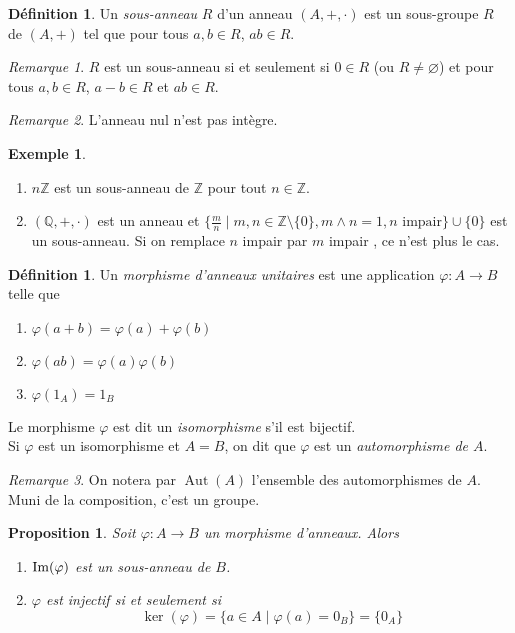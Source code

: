 \documentclass{article}
\newcommand{\Z}{\mathbb{Z}}
\newcommand{\Q}{\mathbb{Q}}
\DeclareMathOperator{\Aut}{Aut}
\renewcommand{\Im}{\mathop{\rm Im}}
\theoremstyle{plain}
\newtheorem{proposition}[theorem]{Proposition}
\theoremstyle{definition}
\newtheorem{definition}[theorem]{Définition}
\newtheorem{example}[theorem]{Exemple}
\theoremstyle{remark}
\newtheorem*{remark}{Remarque}
\begin{document}
\begin{definition}
    Un \emph{sous-anneau} $R$ d'un anneau $(A,+,\cdot)$ est un sous-groupe $R$ de $(A,+)$ tel que pour tous $a,b \in R$, $ab \in R$.
\end{definition}

\begin{remark}
    $R$ est un sous-anneau si et seulement si $0 \in R$ (ou $R \ne \varnothing$) et pour tous $a,b \in R$, $a-b \in R$ et $ab \in R$.
\end{remark}

\begin{remark}
    L'anneau nul n'est pas intègre.
\end{remark}

\begin{example} \leavevmode
    \begin{enumerate}
        \item $n\Z$ est un sous-anneau de $\Z$ pour tout $n \in \Z$.
        \item $(\Q,+,\cdot)$ est un anneau et $\{\frac{m}{n} \mid m,n \in \Z \setminus\{0\}, m \wedge n = 1, n\text{ impair}\} \cup \{0\}$ est un sous-anneau. Si on remplace \og $n$ impair \fg par \og $m$ impair \fg, ce n'est plus le cas.
    \end{enumerate}
\end{example}

\begin{definition}
    Un \emph{morphisme d'anneaux unitaires} est une application $\varphi : A \to B$ telle que
    \begin{enumerate}
        \item $\varphi(a+b) = \varphi(a)+\varphi(b)$
        \item $\varphi(ab) = \varphi(a)\varphi(b)$
        \item $\varphi(1_A) = 1_B$
    \end{enumerate}
    Le morphisme $\varphi$ est dit un \emph{isomorphisme} s'il est bijectif. \\
    Si $\varphi$ est un isomorphisme et $A=B$, on dit que $\varphi$ est un \emph{automorphisme de $A$}.
\end{definition}

\begin{remark}
    On notera par $\Aut(A)$ l'ensemble des automorphismes de $A$. Muni de la composition, c'est un groupe.
\end{remark}

\begin{proposition}
    Soit $\varphi : A \to B$ un morphisme d'anneaux. Alors
    \begin{enumerate}
        \item $\Im(\varphi)$ est un sous-anneau de $B$.
        \item $\varphi$ est injectif si et seulement si
        \[\ker (\varphi) = \{a \in A \mid \varphi(a) = 0_B\} = \{0_A\}\]
    \end{enumerate}
\end{proposition}
\end{document}
